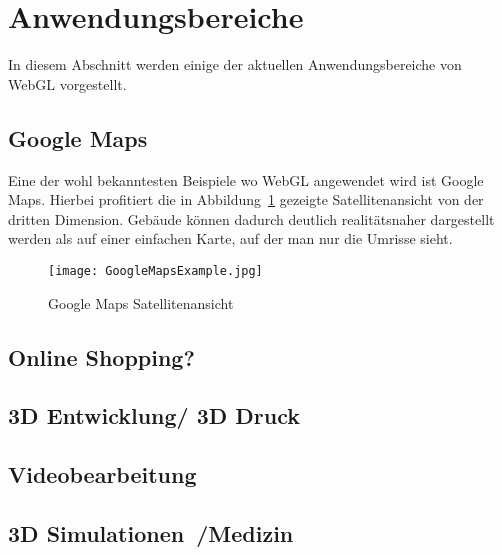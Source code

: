 \section{Anwendungsbereiche}
In diesem Abschnitt werden einige der aktuellen Anwendungsbereiche von WebGL vorgestellt.
\subsection{Google Maps}
Eine der wohl bekanntesten Beispiele wo WebGL angewendet wird ist Google Maps.
Hierbei profitiert die in Abbildung~\ref{fig:GoogleMaps} gezeigte Satellitenansicht von der dritten Dimension.
Gebäude können dadurch deutlich realitätsnaher dargestellt werden als auf einer einfachen Karte, auf der man nur die Umrisse sieht.
\begin{figure}
    \centering
    \texttt{[image: GoogleMapsExample.jpg]}
    \caption{Google Maps Satellitenansicht \cite{GoogleMaps}} \label{fig:GoogleMaps}
    \end{figure}

\subsection{Online Shopping?~\cite{WebGLExamples2}}
\subsection{3D Entwicklung/ 3D Druck}
\subsection{Videobearbeitung}
\subsection{3D Simulationen~\cite{BioDigital}/Medizin}